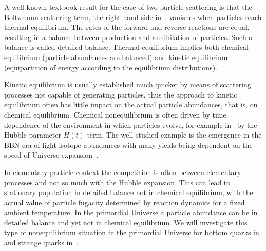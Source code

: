 A well-known textbook result for the case of two particle scattering is that the Boltzmann scattering term, the right-hand side in~, vanishes when particles reach thermal equilibrium. The rates of the forward and reverse reactions are equal, resulting in a balance between production and annihilation of particles. Such a balance is called detailed balance. Thermal equilibrium implies both chemical equilibrium (particle abundances are balanced) and kinetic equilibrium (equipartition of energy according to the equilibrium distributions).

Kinetic equilibrium is usually established much quicker by means of scattering processes not capable of generating particles, thus the approach to kinetic equilibrium often has little impact on the actual particle abundances, that is, on chemical equilibrium. Chemical nonequilibrium is often driven by time dependence of the environment in which particles evolve, for example in~ by the Hubble parameter $H(t)$ term. The well studied example is the emergence in the BBN era of light isotope abundances with many yields being dependent on the speed of Universe expansion~\cite{Pitrou:2018cgg,Kolb:1990vq,Dodelson:2003ft,Mukhanov:2005sc}. 

In elementary particle context the competition is often between elementary processes and not so much with the Hubble expansion. This can lead to stationary population in detailed balance not in chemical equilibrium, with the actual value of particle fugacity determined by reaction dynamics for a fixed ambient temperature. In the primordial Universe a particle abundance can be in detailed balance and yet not in chemical equilibrium. We will investigate this type of nonequilibrium situation in the primordial Universe for bottom quarks in~ and strange quarks in~.

